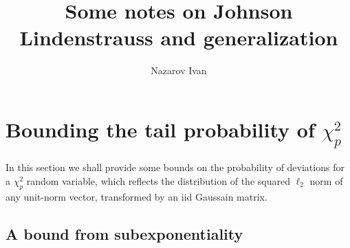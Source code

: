 \documentclass[a4paper,10pt]{article}
\title{Some notes on Johnson Lindenstrauss and generalization}
\author{Nazarov Ivan}
\begin{document}
\maketitle


\section{Bounding the tail probability of $\chi^2_p$} %
\label{sec:bounding_the_tail_probability}

In this section we shall provide some bounds on the probability of deviations for
a $\chi^2_p$ random variable, which reflects the distribution of the squared
$\ell_2$ norm of any unit-norm vector, transformed by an iid Gaussain matrix.


\subsection{A bound from subexponentiality} %
\label{sub:a_bound_from_subexponentiality}
\end{document}
